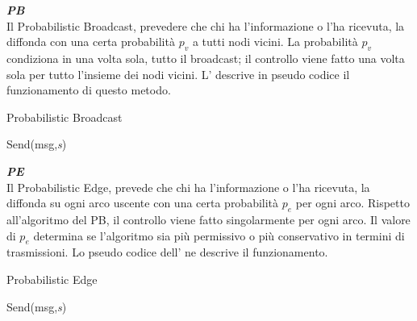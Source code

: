 \noindent\textbf{\textit{\acf{PB}}}\\
Il Probabilistic Broadcast, prevedere che chi ha l'informazione o l'ha ricevuta, la diffonda con una certa probabilità $\mathit{p_v}$ a tutti nodi vicini. La probabilità $\mathit{p_v}$ condiziona in una volta sola, tutto il broadcast; il controllo viene fatto una volta sola per tutto l'insieme dei nodi vicini. L' descrive in pseudo codice il funzionamento di questo metodo.
\bigskip
\begin{algorithm}[h]
	\caption{Probabilistic Broadcast}\label{alg:gossipPB}
	\begin{algorithmic}[1]
					\State Send(msg,\emph{s})
				\EndFor
			\EndIf
		\EndFunction
	\end{algorithmic}
\end{algorithm}
\bigskip

\noindent\textbf{\textit{\acf{PE}}}\\
Il Probabilistic Edge, prevede che chi ha l'informazione o l'ha ricevuta, la diffonda su ogni arco uscente con una certa probabilità $\mathit{p_e}$ per ogni arco. Rispetto all'algoritmo del \acs{PB}, il controllo viene fatto singolarmente per ogni arco. Il valore di $\mathit{p_e}$ determina se l'algoritmo sia più permissivo o più conservativo in termini di trasmissioni. Lo pseudo codice dell' ne descrive il funzionamento.
\bigskip
\begin{algorithm}[h]
	\caption{Probabilistic Edge}\label{alg:gossipPE}
	\begin{algorithmic}[1]
					\State Send(msg,\emph{s})
				\EndIf
			\EndFor
		\EndFunction
	\end{algorithmic}
\end{algorithm}
\bigskip

